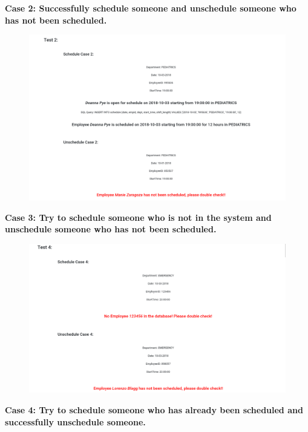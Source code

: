 \documentclass[11pt]{article}
\makeatletter
\def\maxwidth{\ifdim\Gin@nat@width>\linewidth\linewidth
    \else\Gin@nat@width\fi}
\let\Oldincludegraphics\includegraphics
\renewcommand{\includegraphics}[1]{\Oldincludegraphics[width=.8\maxwidth]{#1}}
\makeatother
\begin{document}
\noindent    \textbf{Case 2: Successfully schedule someone and unschedule someone who has not been scheduled.}

\begin{figure}[H]
        \centering
        \includegraphics{5.png}
        \caption{}
    \end{figure}

\noindent    \textbf{Case 3: Try to schedule someone who is not in the system and  unschedule someone who has not been scheduled.}

\begin{figure}[H]
        \centering
        \includegraphics{7.png}
        \caption{}
    \end{figure}

\noindent    \textbf{Case 4: Try to schedule someone who has already been scheduled and  successfully unschedule someone.}
\end{document}
